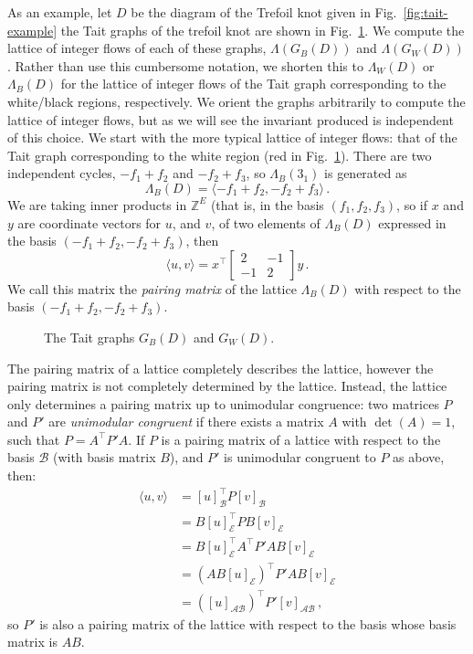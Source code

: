\documentclass[12pt]{report}
\newcommand{\Z}{\mathbb{Z}}
\theoremstyle{upright}
\begin{document}
As an example, let $D$ be the diagram of the Trefoil knot given in Fig.~\ref{fig:tait-example} the Tait graphs of the trefoil knot   are shown in Fig.~\ref{fig:trefoil-abstract-tait}. We compute the lattice of integer flows of each of these graphs, $\Lambda(G_{B}(D))$ and $\Lambda(G_W(D))$. Rather than use this cumbersome notation, we shorten this to $\Lambda_{W}(D)$ or $\Lambda_{B}(D)$ for the lattice of integer flows of the Tait graph corresponding to the white/black regions, respectively. We orient the graphs arbitrarily to compute the lattice of integer flows, but as we will see the invariant produced is independent of this choice. We start with the more typical lattice of integer flows: that of the Tait graph corresponding to the white region (red in Fig.~\ref{fig:trefoil-abstract-tait}). There are two independent cycles, $-f_{1} + f_{2}$ and $-f_{2} + f_{3}$, so $\Lambda_{B}(3_{1})$ is generated as
\[\Lambda_{B}(D) = \langle -f_{1} + f_{2}, -f_{2} + f_{3} \rangle\,.\]
We are taking inner products in $\Z^{E}$ (that is, in the basis {$(f_{1}, f_{2}, f_{3})$}, so if $x$ and $y$ are coordinate vectors for $u$, and $v$, of two elements of $\Lambda_{B}(D)$ expressed in the basis $(-f_{1} + f_{2}, -f_{2} + f_{3})$, then
\[\langle u, v \rangle = x^{\top}\begin{bmatrix}
	2  & -1 \\
	-1 & 2
\end{bmatrix}y\,.\]
We call this matrix the \textit{pairing matrix} of the lattice $\Lambda_{B}(D)$ with respect to the basis ${(-f_{1} + f_{2}, -f_{2} + f_{3})}$.

\begin{figure}[hbt]
	\centering
	\def\svgscale{0.4}
	
	\caption{The Tait graphs $G_{B}(D)$ and $G_{W}(D)$.}
	\label{fig:trefoil-abstract-tait}
\end{figure}

The pairing matrix of a lattice completely describes the lattice, however the pairing matrix is not completely determined by the lattice. Instead, the lattice only determines a pairing matrix up to unimodular congruence: two matrices $P$ and $P'$ are \textit{unimodular congruent} if there exists a matrix $A$ with $\det(A) = 1$, such that $P = A^{\top}P'A$. If $P$ is a pairing matrix of a lattice with respect to the basis $\mathcal{B}$ (with basis matrix $B$), and $P'$ is unimodular congruent to $P$ as above, then:
\begin{align*}
	\langle u, v \rangle & = [u]_{\mathcal{B}}^{\top} P [v]_{\mathcal{B}}                    \\
	                     & = B[u]_{\mathcal{E}}^{\top} P B[v]_{\mathcal{E}}                  \\
	                     & = B[u]_{\mathcal{E}}^{\top} A^{\top} P' A B[v]_{\mathcal{E}}      \\
	                     & = \left( AB[u]_{\mathcal{E}} \right)^{\top} P' AB[v]_{\mathcal{E}} \\
	                     & = \left( [u]_{\mathcal{AB}} \right)^{\top} P' [v]_{\mathcal{AB}}\,,
\end{align*}
so $P'$ is also a pairing matrix of the lattice with respect to the basis whose basis matrix is $AB$.
\end{document}
